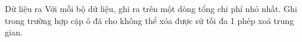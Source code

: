 Dữ liệu ra
Với mỗi bộ dữ liệu, ghi ra trên một dòng tổng chi phí nhỏ nhất. Ghi   trong trường hợp cặp ô đã cho không thể xóa được sử tối đa 1 phép xoá trung gian.